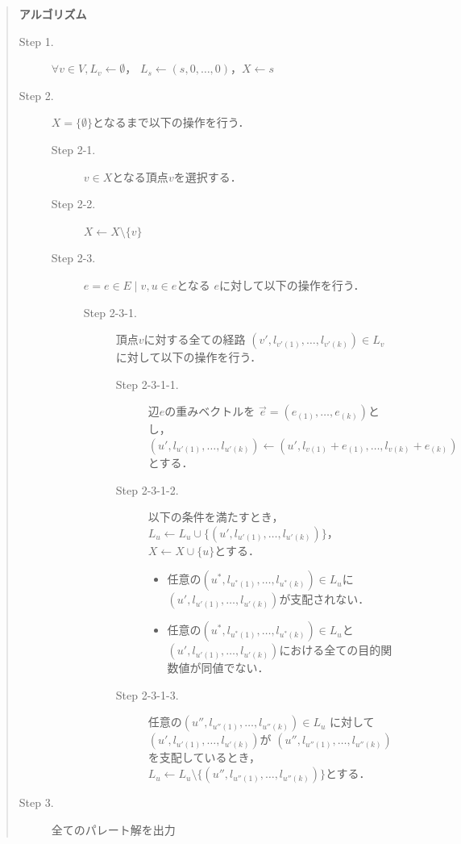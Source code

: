 \documentclass[12pt]{optlab-bachelor}
\begin{document}
\begin{quote}
  \textbf{アルゴリズム}
  \begin{description}
    \item[Step 1.] $\forall v \in V , L_v \leftarrow \emptyset$，
    $L_s \leftarrow (s,0,\ldots,0)$，$X \leftarrow s$
    \item[Step 2.] $X = \{\emptyset\}$となるまで以下の操作を行う．
    \begin{description}
      \item[Step 2-1.] $v \in X$となる頂点$v$を選択する．
      \item[Step 2-2.] $X \leftarrow X \setminus \{ v \}$
      \item[Step 2-3.] $e = {e \in E \mid v,u \in e}$となる
      $e$に対して以下の操作を行う．
      \begin{description}
        \item[Step 2-3-1.] 頂点$v$に対する全ての経路
        $(v',l_{v'(1)},\ldots,l_{v'(k)}) \in L_v$に対して以下の操作を行う．
        \begin{description}
          \item[Step 2-3-1-1.] 辺$e$の重みベクトルを
          $\vec{e} = (e_{(1)},\ldots,e_{(k)})$とし，
          $(u',l_{u'(1)},\ldots,l_{u'(k)}) \leftarrow
          (u',l_{v(1)}+e_{(1)},\ldots,l_{v(k)}+e_{(k)})$とする．
          \item[Step 2-3-1-2.] 以下の条件を満たすとき，
          $L_u \leftarrow L_u \cup \{(u',l_{u'(1)},\ldots,l_{u'(k)})\}$，
          $X \leftarrow X \cup \{ u\}$とする．
          \begin{itemize}
            \item 任意の$(u^*,l_{u^*(1)},\ldots,l_{u^*(k)})\in L_u$に
            $(u',l_{u'(1)},\ldots,l_{u'(k)})$が支配されない．
            \item 任意の$(u^*,l_{u^*(1)},\ldots,l_{u^*(k)}) \in L_u$と
            $(u',l_{u'(1)},\ldots,l_{u'(k)})$における全ての目的関数値が同値でない．
          \end{itemize}
          \item[Step 2-3-1-3.] 任意の$(u'',l_{u''(1)},\ldots,l_{u''(k)})\in L_u$
          に対して$(u',l_{u'(1)},\ldots,l_{u'(k)})$が
          $(u'',l_{u''(1)},\ldots,l_{u''(k)})$を支配しているとき，
          $L_u \leftarrow L_u \setminus \{(u'',l_{u''(1)},\ldots,l_{u''(k)})\}$とする．
        \end{description}
      \end{description}
    \end{description}
    \item[Step 3.] 全てのパレート解を出力
  \end{description}
\end{quote}
\end{document}

